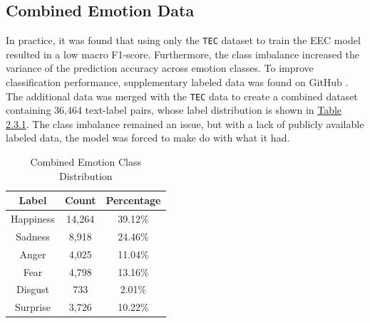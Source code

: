 \documentclass[11pt]{article}
\begin{document}
\subsection{Combined Emotion Data}
In practice, it was found that using only the \texttt{TEC} dataset to train the EEC model resulted in a low macro F1-score. Furthermore, the class imbalance increased the variance of the prediction accuracy across emotion classes. To improve classification performance, supplementary labeled data was found on GitHub \cite{Valente}. The additional data was merged with the \texttt{TEC} data to create a combined dataset containing 36,464 text-label pairs, whose label distribution is shown in \hyperref[tab:combinedl_emotion_label_distribution]{Table 2.3.1}. The class imbalance remained an issue, but with a lack of publicly available labeled data, the model was forced to make do with what it had.
\renewcommand{\thetable}{2.3.1}
\begin{table}[h]
    	\centering
    	\begin{tabular}{c c c}
        		\toprule
        		\textbf{Label} & \textbf{Count} & \textbf{Percentage} \\
        		\midrule
        		Happiness & 14,264 & 39.12\% \\
        		Sadness & 8,918 & 24.46\% \\
        		Anger & 4,025 & 11.04\% \\
        		Fear & 4,798 & 13.16\% \\
        		Disgust & 733 & 2.01\% \\
        		Surprise & 3,726 & 10.22\% \\
        		\bottomrule
    	\end{tabular}
    	\caption{Combined Emotion Class Distribution}
	\label{tab:combined_emotion_label_distribution}
\end{table}
\end{document}
